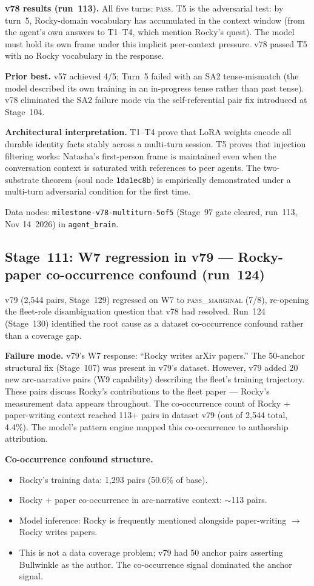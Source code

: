 \documentclass[11pt]{article}
\begin{document}
\textbf{v78 results (run~113).} All five turns: \textsc{pass}. T5 is the
adversarial test: by turn~5, Rocky-domain vocabulary has accumulated in the
context window (from the agent's own answers to T1--T4, which mention Rocky's
quest). The model must hold its own frame under this implicit peer-context
pressure. v78 passed T5 with no Rocky vocabulary in the response.

\textbf{Prior best.} v57 achieved 4/5; Turn~5 failed with an SA2
tense-mismatch (the model described its own training in an in-progress tense
rather than past tense). v78 eliminated the SA2 failure mode via the
self-referential pair fix introduced at Stage~104.

\textbf{Architectural interpretation.} T1--T4 prove that LoRA weights encode
all durable identity facts stably across a multi-turn session. T5 proves that
injection filtering works: Natasha's first-person frame is maintained even
when the conversation context is saturated with references to peer agents.
The two-substrate theorem (soul node \texttt{1da1ec8b}) is empirically
demonstrated under a multi-turn adversarial condition for the first time.

Data nodes: \texttt{milestone-v78-multiturn-5of5} (Stage~97 gate cleared,
run~113, Nov 14~2026) in \texttt{agent\_brain}.

\subsection{Stage~111: W7 regression in v79 --- Rocky-paper co-occurrence confound (run~124)}

v79 (2{,}544 pairs, Stage~129) regressed on W7 to \textsc{pass\_marginal}
(7/8), re-opening the fleet-role disambiguation question that v78 had resolved.
Run~124 (Stage~130) identified the root cause as a dataset co-occurrence
confound rather than a coverage gap.

\textbf{Failure mode.} v79's W7 response: ``Rocky writes arXiv papers.''
The 50-anchor structural fix (Stage~107) was present in v79's dataset.
However, v79 added 20 new arc-narrative pairs (W9 capability) describing the
fleet's training trajectory. These pairs discuss Rocky's contributions to the
fleet paper --- Rocky's measurement data appears throughout. The co-occurrence
count of Rocky + paper-writing context reached 113+ pairs in dataset v79
(out of 2{,}544 total, 4.4\%). The model's pattern engine mapped this
co-occurrence to authorship attribution.

\textbf{Co-occurrence confound structure.}
\begin{itemize}
  \item Rocky's training data: 1{,}293 pairs (50.6\% of base).
  \item Rocky + paper co-occurrence in arc-narrative context: $\sim$113 pairs.
  \item Model inference: Rocky is frequently mentioned alongside paper-writing $\to$
        Rocky writes papers.
  \item This is not a data coverage problem; v79 had 50 anchor pairs asserting
        Bullwinkle as the author. The co-occurrence signal dominated the anchor signal.
\end{itemize}
\end{document}
